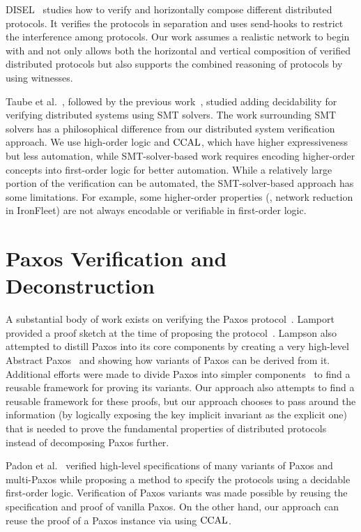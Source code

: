 DISEL~\cite{disel}
studies how to verify and horizontally compose different distributed protocols.
It verifies the protocols in separation and uses send-hooks to restrict the
interference among protocols. Our work assumes a realistic network to begin with
and  not only allows both the horizontal and vertical composition of verified distributed
protocols but also supports the combined reasoning of protocols by using witnesses.

Taube et al.~\cite{modular}, followed by the previous work~\cite{paxosepr}, studied adding
decidability for verifying distributed systems using SMT solvers.
The work surrounding SMT solvers has a philosophical difference from our distributed system verification approach.
We use high-order logic and $\mathrm{CCAL}$, which have higher expressiveness but less automation,
while SMT-solver-based work requires encoding higher-order concepts into
first-order logic for better automation. While a relatively large portion of the
verification can be automated, the SMT-solver-based approach has some limitations.
For example, some higher-order properties (\eg, network reduction
in IronFleet) are not always encodable or verifiable in first-order logic.

\section{Paxos Verification and Deconstruction}
\label{chatper:related:sec:paxos-verification-and-decomposition}

A substantial body of work exists on verifying the Paxos protocol~\cite{paxos}.
Lamport provided a proof sketch at the time of proposing the protocol~\cite{paxosmadesimple}.
Lampson also attempted to distill Paxos into its core components by creating a very
high-level Abstract Paxos~\cite{Lampson2001} and showing how variants of
Paxos can be derived from it. 
Additional efforts were made to divide Paxos
into simpler components~\cite{dpaxos, sdpaxos} to find a reusable framework for
proving its variants. Our approach also attempts
to find a reusable framework for these proofs,
but our approach chooses to pass around the information (by logically exposing the key implicit invariant as the explicit one)
 that is needed to prove the fundamental properties of distributed protocols instead of decomposing Paxos further. 

Padon et al.~\cite{paxosepr} verified high-level specifications of many variants of Paxos
and multi-Paxos while proposing a method to specify the protocols using
a decidable first-order logic. Verification of Paxos
variants was made possible by reusing the specification and proof of vanilla
Paxos. 
On the other hand, our approach can reuse the proof of a Paxos instance
via using $\mathrm{CCAL}$. 


